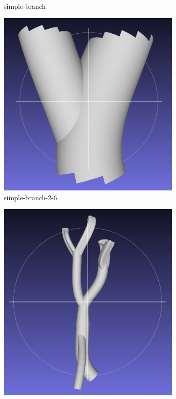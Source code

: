 \documentclass[11p, titlepage]{article}
\begin{document}
\begin{figure}[h]
\begin{subfigure}[b]{0.3\textwidth}
         \caption{simple-branch}
         \label{fig:simple_branch}
     \end{subfigure}
     \hfill
     \begin{subfigure}[b]{0.3\textwidth}
         \centering
         \includegraphics[width=\textwidth]{originals/simple-branch-2-6}
         \caption{simple-branch-2-6}
         \label{fig:simple_branch_focussed}
     \end{subfigure}
     \hfill
     \begin{subfigure}[b]{0.3\textwidth}
         \centering
         \includegraphics[width=\textwidth]{originals/multi-branch}

\end{subfigure}
\end{figure}
\end{document}
